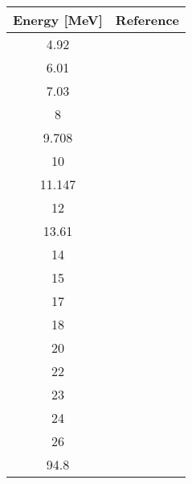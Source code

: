 \begin{tabular}{c c} 
    \toprule
    \bf{Energy [MeV]} & \bf{Reference} \\
    \midrule
    4.92 & \cite{Kinney1972}\\
    6.01 & \cite{Kinney1972}\\
    7.03 & \cite{Kinney1972}\\
    8 & \cite{Bucher1974}\\
    9.708 & \cite{Glendinning1982}\\
    10 & \cite{Anli1989}\\
    11.147 & \cite{Glendinning1982}\\
    12 & \cite{Anli1989}\\
    13.61 & \cite{Boerker1988}\\
    14 & \cite{Anli1989}\\
    15 & \cite{Dave1983}\\
    17 & \cite{Anli1989}\\
    18 & \cite{Delaroche1986}\\
    20 & \cite{Delaroche1986}\\
    22 & \cite{Delaroche1986}\\
    23 & \cite{Lam1985}\\
    24 & \cite{Delaroche1986}\\
    26 & \cite{Delaroche1986}\\
    94.8 & \cite{Mermod2006}\\
    \bottomrule
\end{tabular}
